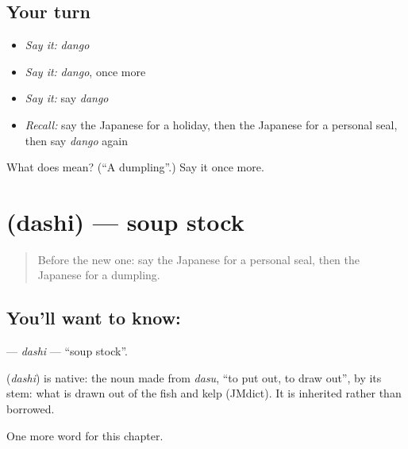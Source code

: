 \subsection*{Your turn}
\begin{itemize}
\raggedright
  \item \emph{Say it:} \emph{dango}
  \item \emph{Say it:} \emph{dango}, once more
  \item \emph{Say it:} say \emph{dango}
  \item \emph{Recall:} say the Japanese for a holiday, then the Japanese for a personal seal, then say \emph{dango} again
\end{itemize}

\begin{tcolorbox}[breakable,colback=teal!4,colframe=teal!35!black,title={Before you move on}]
What does  mean? (\textquotedblleft{}A dumpling\textquotedblright{}.) Say it once more.
\end{tcolorbox}
\section[\texorpdfstring{\ja{だし} (dashi)}{だし (dashi)}]{ (dashi) — soup stock}

\label{lesson:JA-C113-dashi}



\begin{quote}
Before the new one: say the Japanese for a personal seal, then the Japanese for a dumpling.
\end{quote}

\subsection*{You'll want to know: }
\textbf{} — \emph{dashi} — \textquotedblleft{}soup stock\textquotedblright{}.

\begin{cousinweb}
\textbf{} (\emph{dashi}) is native: the noun made from \emph{dasu}, \textquotedblleft{}to put out, to draw out\textquotedblright{}, by its stem: what is drawn out of the fish and kelp (JMdict). It is inherited rather than borrowed.
\end{cousinweb}

\begin{grammarlens}[title={What you've built}]
One more word for this chapter.
\end{grammarlens}

